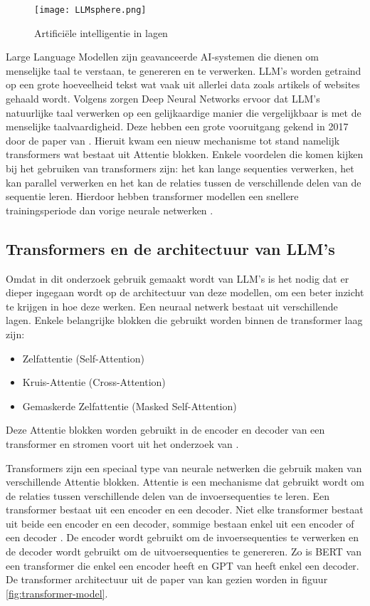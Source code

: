 \begin{figure}[h]
  \centering
  \texttt{[image: LLMsphere.png]}
  \caption{Artificiële intelligentie in lagen \autocite{Stoeffelbauer2023}}
  \label{fig:LLM-position}
\end{figure}

Large Language Modellen zijn geavanceerde AI-systemen die dienen om menselijke taal te verstaan, te genereren en te verwerken.
LLM's worden getraind op een grote hoeveelheid tekst wat vaak uit allerlei data zoals artikels of websites gehaald wordt. 
Volgens \textcite{Beelen2023} zorgen Deep Neural Networks ervoor dat LLM's natuurlijke taal verwerken op een gelijkaardige manier die vergelijkbaar is met de menselijke taalvaardigheid.
Deze hebben een grote vooruitgang gekend in 2017 door de paper van \textcite{VaswaniEtAl2017}. 
Hieruit kwam een nieuw mechanisme tot stand namelijk transformers wat bestaat uit Attentie blokken. 
Enkele voordelen die komen kijken bij het gebruiken van transformers zijn: het kan lange sequenties verwerken, het kan parallel verwerken en het kan de relaties tussen de verschillende delen van de sequentie leren.
Hierdoor hebben transformer modellen een snellere trainingsperiode dan vorige neurale netwerken \autocite{aiml2023}.

\subsection{Transformers en de architectuur van LLM's}
\label{sec:architectuur-van-llms}
Omdat in dit onderzoek gebruik gemaakt wordt van LLM's is het nodig dat er dieper ingegaan wordt op de architectuur van deze modellen, om een beter inzicht te krijgen in hoe deze werken.
Een neuraal netwerk bestaat uit verschillende lagen. Enkele belangrijke blokken die gebruikt worden binnen de transformer laag zijn:
\begin{itemize}
  \item Zelfattentie (Self-Attention)
  \item Kruis-Attentie (Cross-Attention)
  \item Gemaskerde Zelfattentie (Masked Self-Attention)
\end{itemize}

Deze Attentie blokken worden gebruikt in de encoder en decoder van een transformer en stromen voort uit het onderzoek van \textcite{VaswaniEtAl2017}.

Transformers zijn een speciaal type van neurale netwerken die gebruik maken van verschillende Attentie blokken.
Attentie is een mechanisme dat gebruikt wordt om de relaties tussen verschillende delen van de invoersequenties te leren.
Een transformer bestaat uit een encoder en een decoder. 
Niet elke transformer bestaat uit beide een encoder en een decoder, sommige bestaan enkel uit een encoder of een decoder \autocite{Hoque2023}.
De encoder wordt gebruikt om de invoersequenties te verwerken en de decoder wordt gebruikt om de uitvoersequenties te genereren.
Zo is BERT van \textcite{DevlinEtAl2019} een transformer die enkel een encoder heeft en GPT van \textcite{RandfordEtAL2018} heeft enkel een decoder.
De transformer architectuur uit de paper van \textcite{VaswaniEtAl2017} kan gezien worden in figuur \ref{fig:transformer-model}. 

